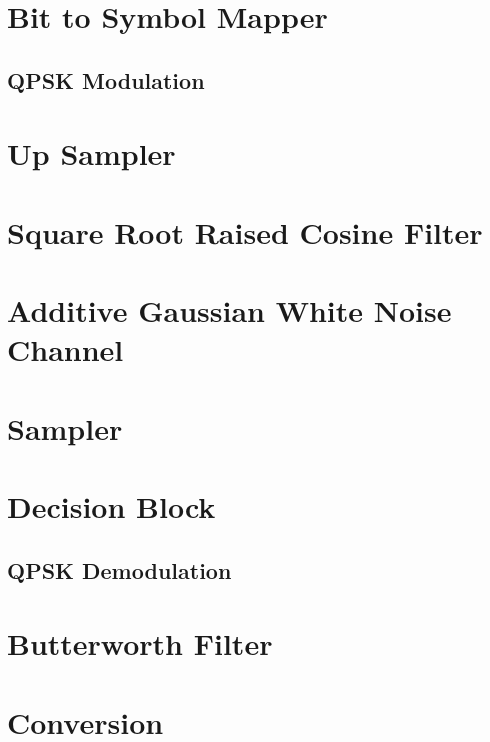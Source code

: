 \documentclass[]{article}
\begin{document}
\section{Bit to Symbol Mapper}
\label{app:bittosym}
\subsection{QPSK Modulation}
\label{app:qpsk_mod}


\section{Up Sampler}
\label{app:impulse_train}


\section{Square Root Raised Cosine Filter}
\label{app:sqrt_raised_cosine}


\section{Additive Gaussian White Noise Channel}
\label{app:awgn_channel}


\section{Sampler}
\label{app:sampler}


\section{Decision Block}
\label{app:dblocks}
\subsection{QPSK Demodulation}
\label{app:qpsk_demod}


\section{Butterworth Filter}
\label{app:butterworth}


\section{Conversion}
\label{app:convert}
\end{document}
